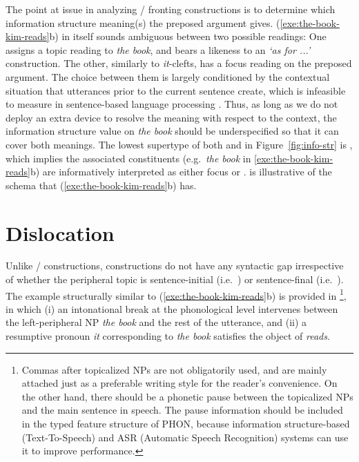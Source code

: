 The point at issue in analyzing / fronting
constructions is to determine which information structure meaning(s)
the preposed argument gives. (\ref{exe:the-book-kim-reads}b) in itself
sounds ambiguous between two possible readings: One assigns a topic
reading to \textit{the book}, and bears a likeness to an \textit{`as
  for ...'}  construction. The other, similarly to \textit{it}-clefts,
has a focus reading on the preposed argument. The choice between them
is largely conditioned by the contextual situation that utterances
prior to the current sentence create, which is infeasible to measure
in sentence-based language processing \citep{kuhn:96}. Thus, as long
as we do not deploy an extra device to resolve the meaning with
respect to the context, the information structure value on \textit{the
  book} should be underspecified so that it can cover both
meanings. The lowest supertype of both
 and  in Figure~\ref{fig:info-str} is
, which implies the associated constituents
(e.g.\ \textit{the book} in \ref{exe:the-book-kim-reads}b) are
informatively interpreted as either focus or
.  is illustrative of the
schema that (\ref{exe:the-book-kim-reads}b) has.







\section{Dislocation}
\label{10:sec:dislocation}


Unlike /  constructions,
 constructions do not have any syntactic gap
irrespective of whether the peripheral topic is sentence-initial
(i.e.\ ) or sentence-final (i.e.\ ). The example structurally similar to
(\ref{exe:the-book-kim-reads}b) is provided in
\footnote{Commas after topicalized
  NPs are not obligatorily used, and are mainly attached just as a
  preferable writing style for the reader's convenience.  On the other
  hand, there should be a phonetic pause between the topicalized NPs
  and the main sentence in speech. The pause information should be
  included in the typed feature structure of PHON, because information
  structure-based  (Text-To-Speech) and ASR (Automatic Speech
  Recognition) systems can use it to improve performance.}, in which
(i) an intonational break at the phonological level intervenes between
the left-peripheral NP \textit{the book} and the rest of the
utterance, and (ii) a resumptive pronoun \textit{it} corresponding to
\textit{the book} satisfies the object of \textit{reads}.


